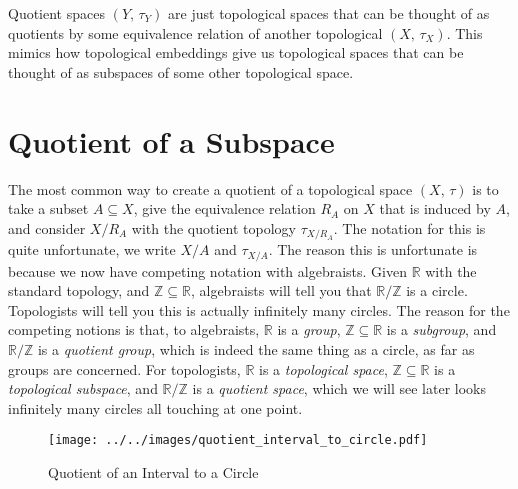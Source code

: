 \documentclass{article}
\theoremstyle{plain}
\theoremstyle{normal}
\begin{document}
        Quotient spaces $(Y,\,\tau_{Y})$ are just topological spaces that can
        be thought of as quotients by some equivalence relation of another
        topological $(X,\,\tau_{X})$. This mimics how topological embeddings
        give us topological spaces that can be thought of as subspaces of some
        other topological space.
    \section{Quotient of a Subspace}
        The most common way to create a quotient of a topological space
        $(X,\,\tau)$ is to take a subset $A\subseteq{X}$, give the equivalence
        relation $R_{A}$ on $X$ that is induced by $A$, and consider
        $X/R_{A}$ with the quotient topology $\tau_{X/R_{A}}$. The notation for
        this is quite unfortunate, we write $X/A$ and $\tau_{X/A}$. The reason
        this is unfortunate is because we now have competing notation with
        algebraists. Given $\mathbb{R}$ with the standard topology, and
        $\mathbb{Z}\subseteq\mathbb{R}$, algebraists will tell you that
        $\mathbb{R}/\mathbb{Z}$ is a circle. Topologists will tell you this is
        actually infinitely many circles. The reason for the competing notions
        is that, to algebraists, $\mathbb{R}$ is a \textit{group},
        $\mathbb{Z}\subseteq\mathbb{R}$ is a \textit{subgroup}, and
        $\mathbb{R}/\mathbb{Z}$ is a \textit{quotient group}, which is indeed
        the same thing as a circle, as far as groups are concerned. For
        topologists, $\mathbb{R}$ is a \textit{topological space},
        $\mathbb{Z}\subseteq\mathbb{R}$ is a \textit{topological subspace},
        and $\mathbb{R}/\mathbb{Z}$ is a \textit{quotient space}, which we will
        see later looks infinitely many circles all touching at one point.
        \begin{figure}
            \centering
            \texttt{[image: ../../images/quotient\_interval\_to\_circle.pdf]}
            \caption{Quotient of an Interval to a Circle}
            \label{fig:quotient_interval_to_circle}
        \end{figure}
\end{document}
